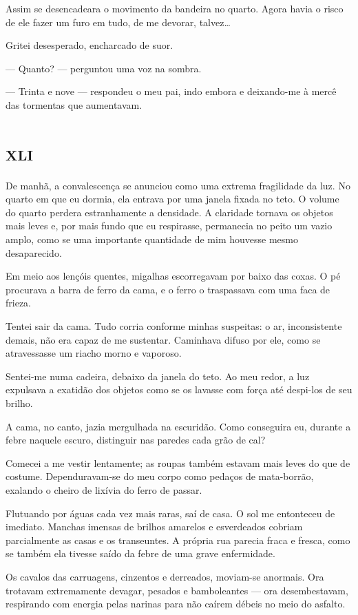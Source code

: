 Assim se desencadeara o movimento da bandeira no quarto. Agora havia o risco de ele fazer um furo em tudo, de me devorar, talvez\ldots{}

Gritei desesperado, encharcado de suor.

--- Quanto? --- perguntou uma voz na sombra.

--- Trinta e nove --- respondeu o meu pai, indo embora e deixando-me à mercê das tormentas que aumentavam.


\chapter*{\huge\centering\textsc{xli}}

De manhã, a convalescença se anunciou como uma extrema fragilidade da luz. No quarto em que eu dormia, ela entrava por uma janela fixada no teto. O volume do quarto perdera estranhamente a densidade. A claridade tornava os objetos mais leves e, por mais fundo que eu respirasse, permanecia no peito um vazio amplo, como se uma importante quantidade de mim houvesse mesmo desaparecido.

Em meio aos lençóis quentes, migalhas escorregavam por baixo das coxas. O pé procurava a barra de ferro da cama, e o ferro o traspassava com uma faca de frieza.

Tentei sair da cama. Tudo corria conforme minhas suspeitas: o ar, inconsistente demais, não era capaz de me sustentar. Caminhava difuso por ele, como se atravessasse um riacho morno e vaporoso.

Sentei-me numa cadeira, debaixo da janela do teto. Ao meu redor, a luz expulsava a exatidão dos objetos como se os lavasse com força até despi-los de seu brilho.

A cama, no canto, jazia mergulhada na escuridão. Como conseguira eu, durante a febre naquele escuro, distinguir nas paredes cada grão de cal?

Comecei a me vestir lentamente; as roupas também estavam mais leves do que de costume. Dependuravam-se do meu corpo como pedaços de mata-borrão, exalando o cheiro de lixívia do ferro de passar.

Flutuando por águas cada vez mais raras, saí de casa. O sol me entonteceu de imediato. Manchas imensas de brilhos amarelos e esverdeados cobriam parcialmente as casas e os transeuntes. A própria rua parecia fraca e fresca, como se também ela tivesse saído da febre de uma grave enfermidade.

Os cavalos das carruagens, cinzentos e derreados, moviam-se anormais. Ora trotavam extremamente devagar, pesados e bamboleantes --- ora desembestavam, respirando com energia pelas narinas para não caírem débeis no meio do asfalto.

